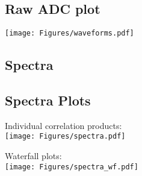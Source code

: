 \subsection{Raw ADC plot}

\texttt{[image: Figures/waveforms.pdf]}


\subsection{Spectra}

\newpage
\subsection{Spectra Plots}


Individual correlation products:\\
\texttt{[image: Figures/spectra.pdf]}

\newpage
Waterfall plots:\\
\texttt{[image: Figures/spectra\_wf.pdf]}



